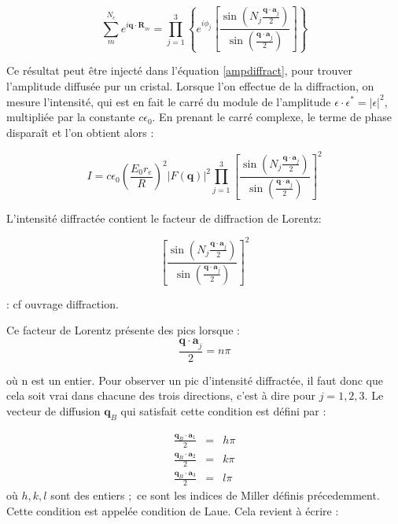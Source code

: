 \begin{equation}
    \sum_m^{N_c} e^{i\mathbf{q\cdot R}_m} = \prod_{j=1}^3 \left\{ e^{i\phi_j} \left[ \frac{\sin \left(N_j \frac{\mathbf{q\cdot a}_j}{2}
    \right)}{\sin \left(\frac{\mathbf{q\cdot a}_j}{2} \right)} \right] \right\}
    \label{sommecristal}
\end{equation}

Ce résultat peut être injecté dans l'équation \ref{ampdiffract}, pour trouver
l'amplitude diffusée pur un cristal. Lorsque l'on effectue de la diffraction, on
mesure l'intensité, qui est en fait le carré du module de l'amplitude
$\epsilon \cdot \epsilon^* = |\epsilon|^2$, multipliée par la constante
$c\epsilon_0$. En prenant le carré complexe, le terme de phase disparaît et l'on
obtient alors :

\begin{equation}
    I = c\epsilon_0 \left( \frac{E_0 r_e}{R} \right)^2 |F(\mathbf{q})|^2
    \prod_{j=1}^3 \left[ \frac{\sin \left(N_j \frac{\mathbf{q\cdot a}_j}{2} \right)}{\sin \left( \frac{\mathbf{q\cdot a}_j}{2}\right)} \right]^2
\end{equation}

L'intensité diffractée contient le facteur de diffraction de Lorentz:

\begin{equation}
    \left[ \frac{\sin \left(N_j \frac{\mathbf{q\cdot a}_j}{2} \right)}{\sin \left( \frac{\mathbf{q\cdot a}_j}{2}\right)} \right]^2
\end{equation}

\TODO: cf ouvrage diffraction.

Ce facteur de Lorentz présente des pics lorsque :
\begin{equation}
    \frac{\mathbf{q \cdot a}_j}{2} = n \pi
\end{equation}

où n est un entier. Pour observer un pic d'intensité diffractée, il faut donc
que cela soit vrai dans chacune des trois directions, c'est à dire pour
$j = 1,2,3$. Le vecteur de diffusion $\mathbf{q}_B$ qui satisfait cette condition
est défini par :

\begin{eqnarray}
    \frac{\mathbf{q}_B \cdot \mathbf{a}_1}{2} & = & h \pi \\
    \frac{\mathbf{q}_B \cdot \mathbf{a}_2}{2} & = & k \pi \\
    \frac{\mathbf{q}_B \cdot \mathbf{a}_3}{2} & = & l \pi
\end{eqnarray}
où $h,k,l$ sont des entiers ; ce sont les indices de Miller définis précedemment.
Cette condition est appelée condition de Laue. Cela revient à écrire :

